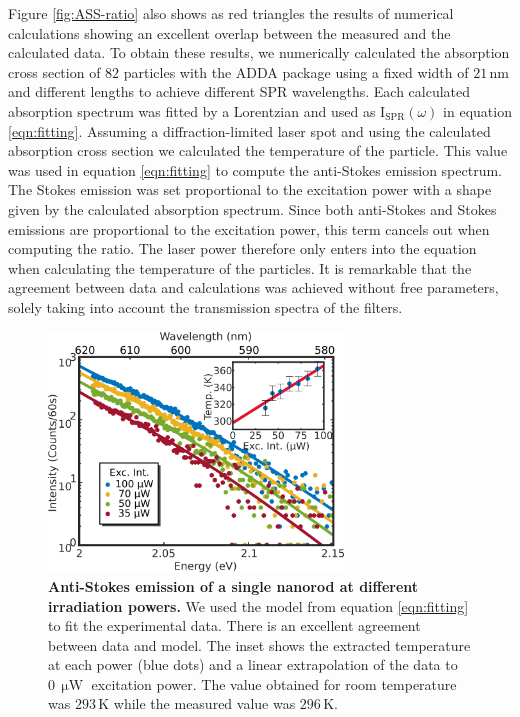\documentclass[journal=nalefd,manuscript=letter]{achemso}
\newcommand{\HI}[1]{{#1}} %
\newcommand{\K}{\ensuremath{\,\textrm{K}}}
\newcommand{\nm}{\ensuremath{\,\textrm{nm}}}
\newcommand{\uW}{\ensuremath{\,\upmu\textrm{W}}}
\begin{document}
Figure \ref{fig:ASS-ratio} also shows as red triangles the results of numerical calculations \HI{showing
an excellent overlap between the measured and the calculated data.
To obtain these results, we numerically calculated the 
absorption cross section of \HI{$82$} particles 
with the ADDA package\cite{Yurkin2011} using a fixed width of $21\nm$ and different 
lengths to achieve different SPR wavelengths.}
Each calculated absorption spectrum was 
fitted by a Lorentzian and used as $\textrm{I}_{\textrm{SPR}}(\omega)$ in equation
\ref{eqn:fitting}. Assuming a diffraction-limited laser spot and using the
calculated absorption cross section we calculated the temperature of
the particle. This value was used in equation \ref{eqn:fitting} to compute the
anti-Stokes emission spectrum. The Stokes emission was set proportional to the
excitation power  with a shape given by the calculated absorption spectrum. Since both
anti-Stokes and Stokes emissions are proportional to the excitation power, this
term cancels out when computing the ratio. The laser power therefore only enters
into the equation when calculating the temperature of the particles. It is
remarkable that the agreement between data and calculations was achieved
without free parameters, solely taking into account the transmission spectra of
the filters.

\begin{figure}[tp] \centering
\includegraphics[width=78.4mm]{Figures/03_Fit_Of_AS/03_Log_Fit_AS.png}
\caption{\textbf{Anti-Stokes emission of a single nanorod at different irradiation powers.} We used 
the model from equation \ref{eqn:fitting} to fit the experimental data. 
There is an excellent agreement between data and model. The inset shows the extracted
temperature at each power (blue dots) and a linear 
extrapolation of the data to $0\uW$ excitation power.
The value obtained for room temperature was $293\K$ while the measured value was
$296\K$.}
	\label{fig:AS_in_Log}
\end{figure}
\end{document}
